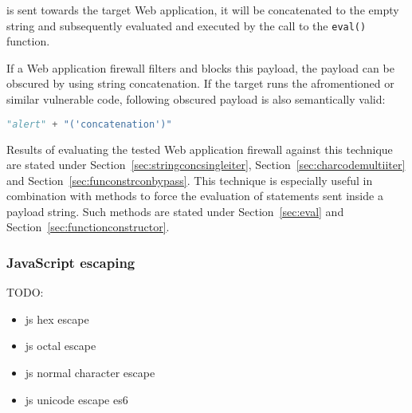 is sent towards the target Web application, it will be concatenated to the empty string and subsequently evaluated and executed by the call to the \verb|eval()| function.

If a Web application firewall filters and blocks this payload, the payload can be obscured by using string concatenation. If the target runs the afromentioned or similar vulnerable code, following obscured payload is also semantically valid:

\begin{lstlisting}[style=basicStyle, language=Python]
"alert" + "('concatenation')"
\end{lstlisting}

Results of evaluating the tested Web application firewall against this technique are stated under Section~\ref{sec:stringconcsingleiter}, Section~\ref{sec:charcodemultiiter} and Section~\ref{sec:funconstrconbypass}. This technique is especially useful in combination with methods to force the evaluation of statements sent inside a payload string. Such methods are stated under Section~\ref{sec:eval} and Section~\ref{sec:functionconstructor}.





\subsubsection{JavaScript escaping}
\label{sec:jsescape}
{\color{red} TODO:
	\begin{itemize}
		\item js hex escape
		\item js octal escape
		\item js normal character escape
		\item js unicode escape es6
	\end{itemize}
}

